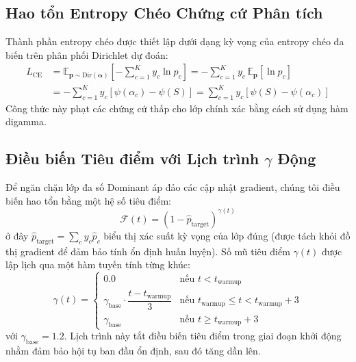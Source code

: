 \documentclass[11pt]{article}
\newcommand{\Dir}{\text{Dir}}
\newcommand{\E}{\mathbb{E}}
\begin{document}
\subsection{Hao tổn Entropy Chéo Chứng cứ Phân tích}\label{subsec:ce_term}

Thành phần entropy chéo được thiết lập dưới dạng kỳ vọng của entropy chéo đa biến trên phân phối Dirichlet dự đoán:
\begin{align}
    L_{\text{CE}} &= \E_{\bm{p} \sim \Dir(\bm{\alpha})} \left[ -\sum_{c=1}^K y_c \ln p_c \right] = -\sum_{c=1}^K y_c \, \E_{\bm{p}}[\ln p_c] \nonumber \\
    &= -\sum_{c=1}^K y_c \left[ \psi(\alpha_c) - \psi(S) \right] = \sum_{c=1}^K y_c \left[ \psi(S) - \psi(\alpha_c) \right] \label{eq:ce_digamma}
\end{align}
Công thức này phạt các chứng cứ thấp cho lớp chính xác bằng cách sử dụng hàm digamma.

\subsection{Điều biến Tiêu điểm với Lịch trình $\gamma$ Động}\label{subsec:focal}

Để ngăn chặn lớp đa số Dominant áp đảo các cập nhật gradient, chúng tôi điều biến hao tổn bằng một hệ số tiêu điểm:
\begin{equation}\label{eq:focal_weight}
    \mathcal{F}(t) = \left(1 - \hat{p}_{\text{target}}\right)^{\gamma(t)}
\end{equation}
ở đây $\hat{p}_{\text{target}} = \sum_c y_c \hat{p}_c$ biểu thị xác suất kỳ vọng của lớp đúng (được tách khỏi đồ thị gradient để đảm bảo tính ổn định huấn luyện). Số mũ tiêu điểm $\gamma(t)$ được lập lịch qua một hàm tuyến tính từng khúc:
\begin{equation}\label{eq:gamma_schedule}
    \gamma(t) = \begin{cases}
        0.0 & \text{nếu } t < t_{\text{warmup}} \\[4pt]
        \gamma_{\text{base}} \cdot \dfrac{t - t_{\text{warmup}}}{3} & \text{nếu } t_{\text{warmup}} \le t < t_{\text{warmup}} + 3 \\[4pt]
        \gamma_{\text{base}} & \text{nếu } t \ge t_{\text{warmup}} + 3
    \end{cases}
\end{equation}
với $\gamma_{\text{base}} = 1.2$. Lịch trình này tắt điều biến tiêu điểm trong giai đoạn khởi động nhằm đảm bảo hội tụ ban đầu ổn định, sau đó tăng dần lên.
\end{document}
